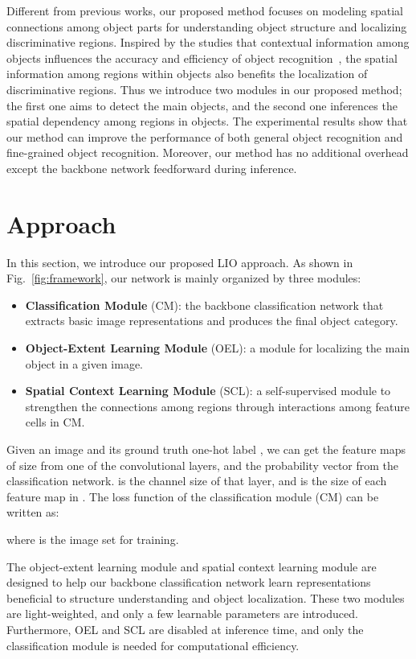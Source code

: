 \documentclass[10pt,twocolumn,letterpaper]{article}
\begin{document}
Different from previous works, our proposed method focuses on modeling spatial connections among object parts for understanding object structure and localizing discriminative regions. Inspired by the studies that contextual information among objects influences the accuracy and efficiency of object recognition~\cite{hock1974contextual}, the spatial information among regions within objects also benefits the localization of discriminative regions. Thus we introduce two modules in our proposed method; the first one aims to detect the main objects, and the second one inferences the spatial dependency among regions in objects. The experimental results show that our method can improve the performance of both general object recognition and fine-grained object recognition. Moreover, our method has no additional overhead except the backbone network feedforward during inference.

\section{Approach} \label{sec:method}
In this section, we introduce our proposed LIO approach. As shown in Fig.~\ref{fig:framework}, our network is mainly organized by three modules: 
\begin{itemize}\setlength\itemsep{-0.2em}
    \item \textbf{Classification Module} (CM): the backbone classification network that extracts basic image representations and produces the final object category.
    \item \textbf{Object-Extent Learning Module} (OEL): a module for localizing the main object in a given image.
    \item \textbf{Spatial Context Learning Module} (SCL): a self-supervised module to strengthen the connections among regions through interactions among feature cells in CM. 
\end{itemize}

Given an image  and its ground truth one-hot label , we can get the feature maps  of size  from one of the convolutional layers, and the probability vector  from the classification network.  is the channel size of that layer, and  is the size of each feature map in . The loss function of the classification module (CM)  can be written as:

where  is the image set for training.

The object-extent learning module and spatial context learning module are designed to help our backbone classification network learn representations beneficial to structure understanding and object localization. These two modules are light-weighted, and only a few learnable parameters are introduced. Furthermore, OEL and SCL are disabled at inference time, and only the classification module is needed for computational efficiency.
\end{document}
